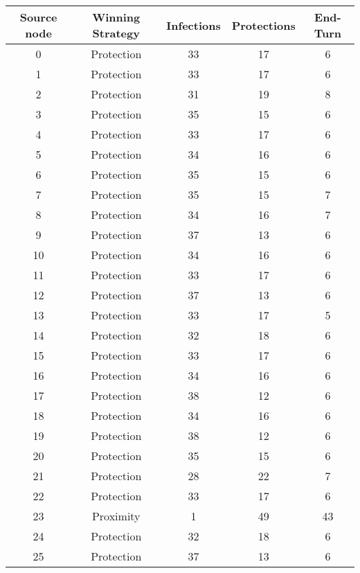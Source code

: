 \documentclass[results.tex]{subfiles}
\begin{document}
\begin{center}
  \begin{tabular}{| c || c | c | c | c |}
    \hline
    {\bfseries Source node} & {\bfseries Winning Strategy} & {\bfseries Infections} & {\bfseries Protections} & {\bfseries End-Turn} \\  %
    \hline\hline
    0 & Protection & 33 & 17 & 6 \\ 
    \hline
    1 & Protection & 33 & 17 & 6 \\ 
    \hline
    2 & Protection & 31 & 19 & 8 \\ 
    \hline
    3 & Protection & 35 & 15 & 6 \\ 
    \hline
    4 & Protection & 33 & 17 & 6 \\ 
    \hline
    5 & Protection & 34 & 16 & 6 \\ 
    \hline
    6 & Protection & 35 & 15 & 6 \\ 
    \hline
    7 & Protection & 35 & 15 & 7 \\ 
    \hline
    8 & Protection & 34 & 16 & 7 \\ 
    \hline
    9 & Protection & 37 & 13 & 6 \\ 
    \hline
    10 & Protection & 34 & 16 & 6 \\ 
    \hline
    11 & Protection & 33 & 17 & 6 \\ 
    \hline
    12 & Protection & 37 & 13 & 6 \\ 
    \hline
    13 & Protection & 33 & 17 & 5 \\ 
    \hline
    14 & Protection & 32 & 18 & 6 \\ 
    \hline
    15 & Protection & 33 & 17 & 6 \\ 
    \hline
    16 & Protection & 34 & 16 & 6 \\ 
    \hline
    17 & Protection & 38 & 12 & 6 \\ 
    \hline
    18 & Protection & 34 & 16 & 6 \\ 
    \hline
    19 & Protection & 38 & 12 & 6 \\ 
    \hline
    20 & Protection & 35 & 15 & 6 \\ 
    \hline
    21 & Protection & 28 & 22 & 7 \\ 
    \hline
    22 & Protection & 33 & 17 & 6 \\ 
    \hline
    23 & Proximity & 1 & 49 & 43 \\ 
    \hline
    24 & Protection & 32 & 18 & 6 \\ 
    \hline
    25 & Protection & 37 & 13 & 6 \\ 

\end{tabular}
\end{center}
\end{document}
